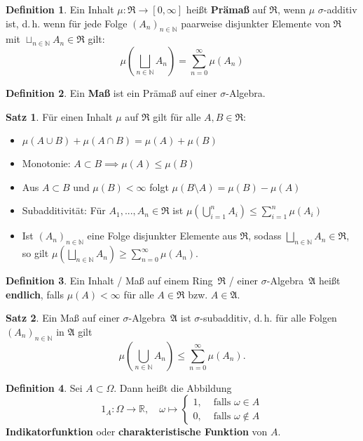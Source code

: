 \documentclass[a4paper,10pt,landscape]{article}
\newcommand{\R}{\mathbb{R}}
\newcommand{\N}{\mathbb{N}}
\newcommand{\Alg}{\mathfrak{A}}
\newcommand{\Ring}{\mathfrak{R}}
\theoremstyle{definition}
\newtheorem*{defn}{Definition}
\newtheorem*{satz}{Satz}
\theoremstyle{remark}
\renewcommand{\emph}[1]{\textcolor{Emph}{\bf{#1}}}
\begin{document}
\begin{multicols}{3}
\begin{defn}
  Ein Inhalt $\mu : \Ring \to [0, \infty]$ heißt \emph{Prämaß} auf $\Ring$, wenn $\mu$ $\sigma$-additiv ist, d.\,h. wenn für jede Folge $(A_n)_{n \in \N}$ paarweise disjunkter Elemente von $\Ring$ mit $\sqcup_{n \in \N} A_n \in \Ring$ gilt:
  \[ \mu\left(\bigsqcup_{n \in \N} A_n\right) = \sum_{n=0}^\infty \mu(A_n) \]
\end{defn}

\begin{defn}
  Ein \emph{Maß} ist ein Prämaß auf einer $\sigma$-Algebra.
\end{defn}

\begin{satz}
  Für einen Inhalt $\mu$ auf $\Ring$ gilt für alle $A, B \in \Ring$:
  \begin{itemize}
    \item $\mu(A \cup B) + \mu(A \cap B) = \mu(A) + \mu(B)$
    \item Monotonie: $A \subset B \implies \mu(A) \leq \mu(B)$
    \item Aus $A \subset B$ und $\mu(B) < \infty$ folgt $\mu(B \setminus A) = \mu(B) - \mu(A)$
    \item Subadditivität: Für $A_1, ..., A_n \in \Ring$ ist $\mu\left(\bigcup_{i = 1}^n A_i \right) \leq \sum_{i = 1}^n \mu(A_i)$
    \item Ist $(A_n)_{n \in \N}$ eine Folge disjunkter Elemente aus $\Ring$, sodass $\bigsqcup_{n \in \N} A_n \in \Ring$, so gilt $\mu(\bigsqcup_{n \in \N} A_n) \geq \sum_{n=0}^\infty \mu(A_n)$.
  \end{itemize}
\end{satz}

\begin{defn}
  Ein Inhalt / Maß auf einem Ring~$\Ring$ / einer $\sigma$-Algebra~$\Alg$ heißt \emph{endlich}, falls $\mu(A) < \infty$ für alle $A \in \Ring$ bzw. $A \in \Alg$.
\end{defn}

\begin{satz}
  Ein Maß auf einer $\sigma$-Algebra~$\Alg$ ist $\sigma$-subadditiv, d.\,h. für alle Folgen $(A_n)_{n \in \N}$ in $\Alg$ gilt
  \[ \mu(\bigcup_{n \in \N} A_n) \leq \sum_{n=0}^\infty \mu(A_n). \]
\end{satz}

\begin{defn}
  Sei $A \subset \Omega$. Dann heißt die Abbildung
  \[ 1_A : \Omega \to \R, \quad \omega \mapsto \begin{cases} 1, & \text{ falls } \omega \in A \\ 0, & \text{ falls } \omega \not\in A \end{cases} \]
  \emph{Indikatorfunktion} oder \emph{charakteristische Funktion} von $A$.
\end{defn}


\end{multicols}
\end{document}
